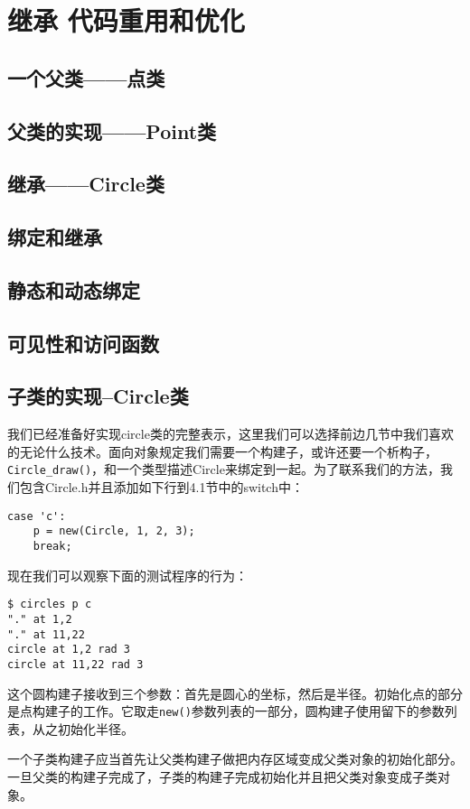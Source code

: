 \chapter{继承 代码重用和优化}
\section{一个父类——点类}
\section{父类的实现——Point类}
\section{继承——Circle类}
\section{绑定和继承}
\section{静态和动态绑定}
\section{可见性和访问函数}
\section{子类的实现--Circle类}

我们已经准备好实现circle类的完整表示，这里我们可以选择前边几节中我们喜欢的无论什么技术。面向对象规定我们需要一个构建子，或许还要一个析构子，\verb|Circle_draw()|，和一个类型描述Circle来绑定到一起。为了联系我们的方法，我们包含Circle.h并且添加如下行到4.1节中的switch中：

\begin{lstlisting}
case 'c':
	p = new(Circle, 1, 2, 3);
	break;
\end{lstlisting}

现在我们可以观察下面的测试程序的行为：

\begin{lstlisting}
$ circles p c
"." at 1,2
"." at 11,22
circle at 1,2 rad 3
circle at 11,22 rad 3
\end{lstlisting}

这个圆构建子接收到三个参数：首先是圆心的坐标，然后是半径。初始化点的部分是点构建子的工作。它取走\verb|new()|参数列表的一部分，圆构建子使用留下的参数列表，从之初始化半径。

一个子类构建子应当首先让父类构建子做把内存区域变成父类对象的初始化部分。一旦父类的构建子完成了，子类的构建子完成初始化并且把父类对象变成子类对象。

